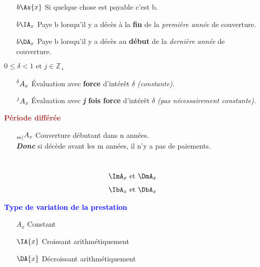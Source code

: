 \documentclass[10pt, french]{article}
\begin{document}
\begin{multicols*}{3}
\textbf{{}}
\begin{itemize}
	\item[$b \Ax{x}$] Si quelque chose est payable c'est b.
	\item[$b \IA_x$] Paye b lorsqu'il y a décès à la \textbf{fin} de la \textit{première année} de couverture.
	\item[$b \DA_x$] Paye b lorsqu'il y a décès au \textbf{début} de la \textit{dernière année} de couverture.
\end{itemize}

\textbf{{}}

$0 \leq \delta < 1 \text{ et } j \in \mathbb{Z}_+$
\begin{itemize}
	\item[$\prescript{\delta}{}{A}_x$] Évaluation avec \textbf{force} d'intérêt $\delta$ \textit{(constante)}.
	\item[$\prescript{j}{}{A}_x$] Évaluation avec \textbf{\textit{j} fois force} d'intérêt $\delta$ \textit{(pas nécessairement constante)}.
\end{itemize}

\textbf{\textcolor{brown}{Période différée}}
\begin{itemize}
	\item[$\prescript{}{m|}A_{x}$] Couverture débutant dans n années.\\
	\textbf{\textit{Donc}} si décède avant les m années, il n'y a pas de paiements.
\end{itemize}

\textbf{{\color{violet}{Fréquence de variation}}} \\
{\color{violet}{variation m fois par année}}
\begin{align*}
	\ImA_{x} \text{ et } \DmA_{x} 
\end{align*}
{}
\begin{align*}
	\IbA_x \text{ et } \DbA_x 
\end{align*}

\textbf{\textcolor{blue}{Type de variation de la prestation}}
\begin{itemize}
	\item[$A_{x}$] Constant
	\item[$\IA{x}$] Croissant arithmétiquement
	\item[$\DA{x}$] Décroissant arithmétiquement
\end{itemize}


\end{multicols*}
\end{document}
